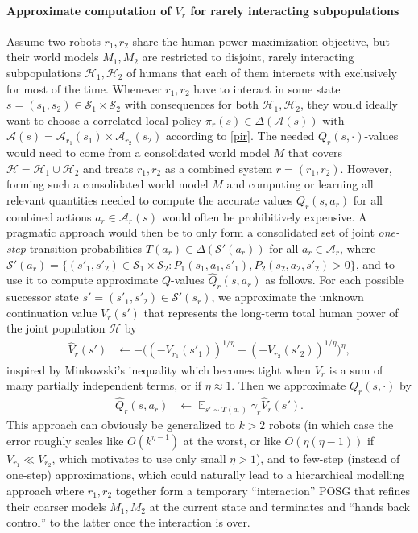 \documentclass[letterpaper]{article} %
\DeclareMathOperator*{\E}{\mathbb{E}}
\def\A{\mathcal{A}}
\def\H{\mathcal{H}}
\def\S{\mathcal{S}}
\begin{document}
\paragraph{Approximate computation of $V_r$ for rarely interacting subpopulations}
Assume two robots $r_1,r_2$ share the human power maximization objective, but their world models $M_1,M_2$ are restricted to disjoint, rarely interacting subpopulations $\H_1,\H_2$ of humans that each of them interacts with exclusively for most of the time.
Whenever $r_1,r_2$ have to interact in some state $s=(s_1,s_2)\in\S_1\times\S_2$ with consequences for both $\H_1,\H_2$, they would ideally want to choose a correlated local policy $\pi_r(s)\in\Delta(\A(s))$ with $\A(s)=\A_{r_1}(s_1)\times\A_{r_2}(s_2)$ according to \eqref{pir}. 
The needed $Q_r(s,\cdot)$-values would need to come from a consolidated world model $M$ that covers $\H=\H_1\cup\H_2$ and treats $r_1,r_2$ as a combined system $r=(r_1,r_2)$. 
However, forming such a consolidated world model $M$ and computing or learning all relevant quantities needed to compute the accurate values $Q_r(s,a_r)$ for all combined actions $a_r\in\A_r(s)$ would often be prohibitively expensive.
A pragmatic approach would then be to only form a consolidated set of joint {\em one-step} transition probabilities $T(a_r)\in\Delta(\S'(a_r))$ for all $a_r\in\A_r$, where $\S'(a_r)=\{(s'_1,s'_2)\in\S_1\times\S_2:P_1(s_1,a_1,s'_1),P_2(s_2,a_2,s'_2)>0\}$,
and to use it to compute approximate $Q$-values
$\hat Q_r(s,a_r)$ as follows.
For each possible successor state $s'=(s'_1,s'_2)\in\S'(s_r)$, we approximate the unknown continuation value $V_r(s')$ that represents the long-term total human power of the joint population $\H$ by 
\begin{align*}
    \hat V_r(s') &\gets -\big((-V_{r_1}(s'_1))^{1/\eta}+(-V_{r_2}(s'_2))^{1/\eta}\big)^\eta,
\end{align*}
inspired by Minkowski's inequality which becomes tight when $V_r$ is a sum of many partially independent terms, or if $\eta\approx 1$.
Then we approximate $Q_r(s,\cdot)$ by
\begin{align*}
    \hat Q_r(s,a_r) &\gets \E_{s'\sim T(a_r)}\gamma_r\hat V_r(s').
\end{align*}
This approach can obviously be generalized to $k>2$ robots (in which case the error roughly scales like $O(k^{\eta-1})$ at the worst, or like $O(\eta(\eta-1))$ if $V_{r_1}\ll V_{r_2}$, which motivates to use only small $\eta>1$), and to few-step (instead of one-step) approximations, which could naturally lead to a hierarchical modelling approach where $r_1,r_2$ together form a temporary ``interaction'' POSG that refines their coarser models $M_1,M_2$ at the current state and terminates and ``hands back control'' to the latter once the interaction is over.
\end{document}
